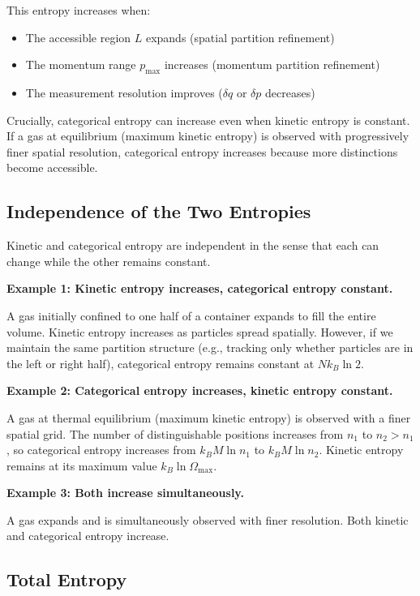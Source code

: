 \documentclass[twocolumn,10pt]{article}
\theoremstyle{definition}
\theoremstyle{remark}
\begin{document}
This entropy increases when:
\begin{itemize}
\item The accessible region $L$ expands (spatial partition refinement)
\item The momentum range $p_{\text{max}}$ increases (momentum partition refinement)
\item The measurement resolution improves ($\delta q$ or $\delta p$ decreases)
\end{itemize}

Crucially, categorical entropy can increase even when kinetic entropy is constant. If a gas at equilibrium (maximum kinetic entropy) is observed with progressively finer spatial resolution, categorical entropy increases because more distinctions become accessible.

\subsection{Independence of the Two Entropies}

Kinetic and categorical entropy are independent in the sense that each can change while the other remains constant.

\textbf{Example 1: Kinetic entropy increases, categorical entropy constant.}

A gas initially confined to one half of a container expands to fill the entire volume. Kinetic entropy increases as particles spread spatially. However, if we maintain the same partition structure (e.g., tracking only whether particles are in the left or right half), categorical entropy remains constant at $N k_B \ln 2$.

\textbf{Example 2: Categorical entropy increases, kinetic entropy constant.}

A gas at thermal equilibrium (maximum kinetic entropy) is observed with a finer spatial grid. The number of distinguishable positions increases from $n_1$ to $n_2 > n_1$, so categorical entropy increases from $k_B M \ln n_1$ to $k_B M \ln n_2$. Kinetic entropy remains at its maximum value $k_B \ln \Omega_{\text{max}}$.

\textbf{Example 3: Both increase simultaneously.}

A gas expands and is simultaneously observed with finer resolution. Both kinetic and categorical entropy increase.

\subsection{Total Entropy}
\end{document}
